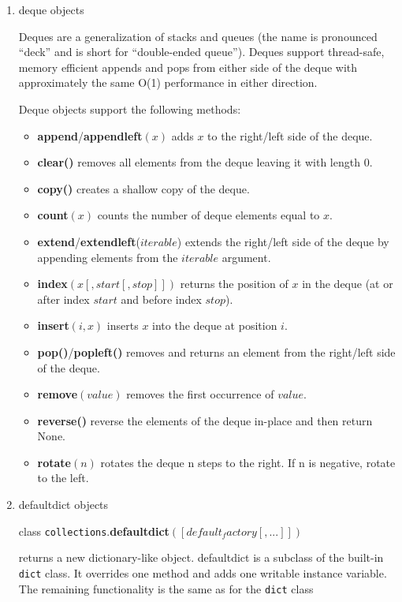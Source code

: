 \begin{enumerate}
\item deque objects

Deques are a generalization of stacks and queues (the name is pronounced “deck” and is short for “double-ended queue”). Deques support thread-safe, memory efficient appends and pops from either side of the deque with approximately the same O(1) performance in either direction.

Deque objects support the following methods:
\begin{itemize}
\item \textbf{append}/\textbf{appendleft}$(x)$ adds $x$ to the right/left side of the deque.
\item \textbf{clear()} removes all elements from the deque leaving it with length 0.
\item \textbf{copy()} creates a shallow copy of the deque.
\item \textbf{count}$(x)$ counts the number of deque elements equal to $x$.
\item \textbf{extend}/\textbf{extendleft}($iterable$) extends the right/left side of the deque by appending elements from the $iterable$ argument.
\item \textbf{index}$(x[, start[, stop]])$ returns the position of $x$ in the deque (at or after index $start$ and before index $stop$).
\item \textbf{insert}$(i, x)$ inserts $x$ into the deque at position $i$.
\item \textbf{pop()}/\textbf{popleft()} removes and returns an element from the right/left side of the deque.
\item \textbf{remove}$(value)$ removes the first occurrence of $value$.
\item \textbf{reverse()} reverse the elements of the deque in-place and then return None.
\item \textbf{rotate}$(n)$ rotates the deque n steps to the right. If n is negative, rotate to the left.
\end{itemize}

\item defaultdict objects

class \texttt{collections}.\textbf{defaultdict}$([default_factory[, ...]])$

returns a new dictionary-like object. defaultdict is a subclass of the built-in \texttt{dict} class. It overrides one method and adds one writable instance variable. The remaining functionality is the same as for the \texttt{dict} class


\end{enumerate}
